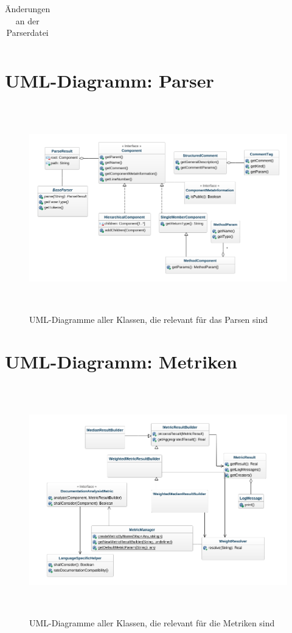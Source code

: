\begin{appendices}
\begin{table}[h!]
\begin{tabular}{m{0.75cm}|m{4cm}|m{10cm}}
    \end{tabular}
    \caption{Änderungen an der Parserdatei}
    \label{tab:parser_changes}
\end{table}

\chapter{UML-Diagramm: Parser}\label{appendix_parsing_uml}
\begin{figure}[ht!]
\fontsize{5}{10}\selectfont
    \centering
    \includegraphics[height=9cm,keepaspectratio,angle=90]{figures/uml/parsing.png}
    \caption{UML-Diagramme aller Klassen, die relevant für das Parsen sind}
    \label{fig:uml_parsing}
\end{figure}
\chapter{UML-Diagramm: Metriken}\label{appendix_metrics_uml}
\begin{figure}[ht!]
\fontsize{5}{10}\selectfont
    \centering
    \includegraphics[height=10cm,keepaspectratio,angle=90]{figures/uml/metriken.png}
    \caption{UML-Diagramme aller Klassen, die relevant für die Metriken sind}
    \label{fig:uml_metrics}
\end{figure}

\end{appendices}
